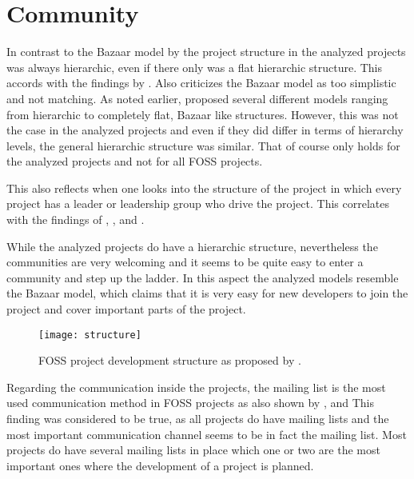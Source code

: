 
\section{Community} %

In contrast to the Bazaar model by \textcite{Raymond1998} the project structure
in the analyzed projects was always hierarchic, even if there only was a flat
hierarchic structure. This accords with the findings by
\textcite{Crowston2005}. Also \textcite{Bezroukov1999,Bezroukov1999a}
criticizes the Bazaar model as too simplistic and not matching. As noted
earlier, \textcite{Ghosh2005} proposed several different models ranging from
hierarchic to completely flat, Bazaar like structures. However, this was not
the case in the analyzed projects and even if they did differ in terms of
hierarchy levels, the general hierarchic structure was similar. That of course
only holds for the analyzed projects and not for all \ac{FOSS} projects.

This also reflects when one looks into the structure of the project in which
every project has a leader or leadership group who drive the project. This
correlates with the findings of \textcite{Johnson2001},
\textcite{Crowston2005a}, \textcite{Warsta2003} and
\textcite{Krishnamurthy2002}.

While the analyzed projects do have a hierarchic structure, nevertheless the
communities are very welcoming and it seems to be quite easy to enter a
community and step up the ladder. In this aspect the analyzed models resemble
the Bazaar model, which claims that it is very easy for new developers
to join the project and cover important parts of the project.

\begin{figure}[htbp]
  \centering
  \texttt{[image: structure]}
  \caption{\acl{FOSS} project development structure as proposed by \textcite{Crowston2005}.}
\end{figure}

Regarding the communication inside the projects, the mailing list is the most
used communication method in \ac{FOSS} projects as also shown by
\textcite{Schweik2003}, \textcite{Ogawa2007} and \textcite{Kim2003} This
finding was considered to be true, as all projects do have mailing lists and
the most important communication channel seems to be in fact the mailing list.
Most projects do have several mailing lists in place which one or two are the
most important ones where the development of a project is planned.

